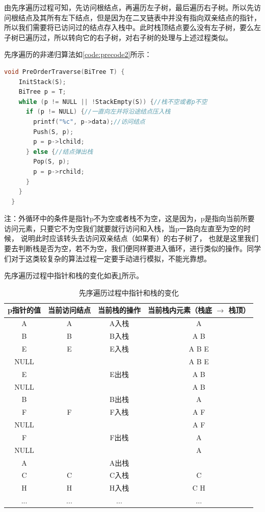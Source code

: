 \documentclass[lang=cn,newtx,10pt,scheme=chinese]{elegantbook}
\begin{document}
由先序遍历过程可知，先访问根结点，再遍历左子树，最后遍历右子树。所以先访问根结点及其所有左下结点，但是因为在二叉链表中并没有指向双亲结点的指针，
所以我们需要将已访问过的结点存入栈中。此时栈顶结点要么没有左子树，要么左子树已遍历过，所以转向它的右子树，对右子树的处理与上述过程类似。

先序遍历的非递归算法如\ref{code:precode2}所示：

\begin{lstlisting}[language=C++, caption={先序遍历}, label={code:precode2}]
  void PreOrderTraverse(BiTree T) {
    InitStack(S);
    BiTree p = T;
    while (p != NULL || !StackEmpty(S)) {//栈不空或者p不空
      if (p != NULL) {//一直向左并将沿途结点压入栈
        printf("%c", p->data);//访问结点
        Push(S, p);
        p = p->lchild;
      } else {//结点弹出栈
        Pop(S, p);
        p = p->rchild;
      }
    }
  }
\end{lstlisting}

注：外循环中的条件是指针p不为空或者栈不为空，这是因为，p是指向当前所要访问元素，只要它不为空我们就要就行访问和入栈，当p一路向左直至为空的时候，
说明此时应该转头去访问双亲结点（如果有）的右子树了，
也就是这里我们要去判断栈是否为空，若不为空，我们便同样要进入循环，进行类似的操作。同学们对于这类较复杂的算法过程一定要手动进行模拟，不能光靠想。

先序遍历过程中指针和栈的变化如表\ref{tab:preorder_stack}所示。

\begin{table}[h!]
  \centering
  \caption{先序遍历过程中指针和栈的变化}
  \begin{tabular}{|c|c|c|c|}
  \hline
  \textbf{p指针的值} & \textbf{当前访问结点} & \textbf{当前栈的操作} & \textbf{当前栈内元素（栈底 $\to$ 栈顶）} \\ \hline
  A & A & A入栈 & A \\ \hline
  B & B & B入栈 & A B \\ \hline
  E & E & E入栈 & A B E \\ \hline
  NULL &  &  & A B E \\ \hline
  E &  & E出栈 & A B \\ \hline
  NULL &  &  & A B \\ \hline
  B &  & B出栈 & A \\ \hline
  F & F & F入栈 & A F \\ \hline
  NULL &  &  & A F \\ \hline
  F &  & F出栈 & A \\ \hline
  NULL &  &  & A \\ \hline
  A &  & A出栈 &  \\ \hline
  C & C & C入栈 & C \\ \hline
  H & H & H入栈 & C H \\ \hline
  ... & ... & ... & ... \\ \hline
  \end{tabular}
  \label{tab:preorder_stack}
  \end{table}
\end{document}

